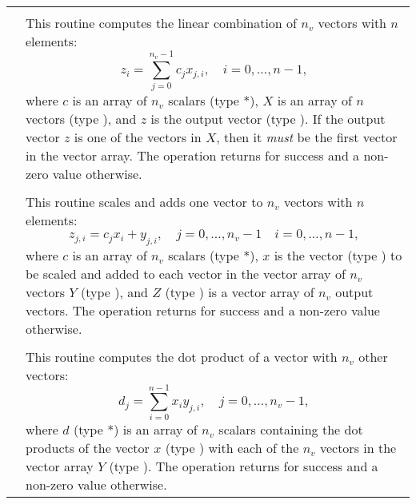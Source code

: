 \label{t:nvecfusedops}
\tablelasttail{\hline}
\begin{xtabular}{|p{\coloneb}|p{\coltwob}|}

 &  \\ 
& This routine computes the linear combination of $n_v$ vectors with $n$
elements:
\begin{equation*}
z_i = \sum_{j=0}^{n_v-1} c_j x_{j,i}, \quad i=0,\ldots,n-1,
\end{equation*}
where $c$ is an array of $n_v$ scalars (type *), $X$ is an array of
$n$ vectors (type ), and $z$ is the output vector (type
). If the output vector $z$ is one of the vectors in $X$, then it
\textit{must} be the first vector in the vector array. The operation returns
 for success and a non-zero value otherwise.
\\[2mm]

 &  \\ 
& This routine scales and adds one vector to $n_v$ vectors with $n$ elements:
\begin{equation*}
z_{j,i} = c_j x_i + y_{j,i}, \quad j=0,\ldots,n_v-1 \quad i=0,\ldots,n-1,
\end{equation*}
where $c$ is an array of $n_v$ scalars (type *), $x$ is the vector
(type ) to be scaled and added to each vector in the vector array
of $n_v$ vectors $Y$ (type ), and $Z$ (type ) is a
vector array of $n_v$ output vectors. The operation returns  for success and a
non-zero value otherwise.
\\[2mm]

 &  \\ 
& This routine computes the dot product of a vector with $n_v$ other vectors:
\begin{equation*}
d_j = \sum_{i=0}^{n-1} x_i y_{j,i}, \quad j=0,\ldots,n_v-1,
\end{equation*}
where $d$ (type *) is an array of $n_v$ scalars containing the
dot products of the vector $x$ (type ) with each of the $n_v$
vectors in the vector array $Y$ (type ). The operation returns
 for success and a non-zero value otherwise.
\\
\end{xtabular}
\bigskip

